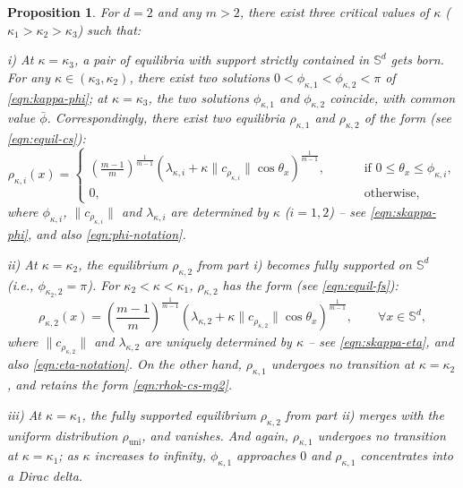 \documentclass[11pt]{amsart}
\newtheorem{proposition}{Proposition}[section]
\newcommand{\bbs}{\mathbb S}
\newcommand{\rhou}{\rho_{\mathrm{uni}}}
\newcommand{\dm}{d} %
\begin{document}
\begin{proposition} \cite[Proposition 6.1]{FePaVa2025}
\label{prop:bif-mg2}
For $\dm=2$ and any $m>2$, there exist three critical values of $\kappa$ ($\kappa_1>\kappa_2>\kappa_3$) such that:

\noindent i) At $\kappa=\kappa_3$, a pair of equilibria with support strictly contained in $\bbs^\dm$ gets born. For any $\kappa \in (\kappa_3,\kappa_2)$, there exist two solutions $0<\phi_{\kappa,1}<\phi_{\kappa,2}<\pi$ of \eqref{eqn:kappa-phi}; at $\kappa=\kappa_3$, the two solutions $\phi_{\kappa,1}$ and $\phi_{\kappa,2}$ coincide, with common value $\bar{\phi}$. Correspondingly, there exist two equilibria $\rho_{\kappa,1}$ and $\rho_{\kappa,2}$ of the form (see \eqref{eqn:equil-cs}):
\begin{equation}
\label{eqn:rhok-cs-mg2}
\rho_{\kappa,i}(x)=\begin{cases}
\left(\frac{m-1}{m}\right)^{\frac{1}{m-1}}\left(\lambda_{\kappa,i}+\kappa \|c_{\rho_{\kappa,i}}\| \cos\theta_x\right)^{\frac{1}{m-1}},\qquad&\text{ if }0\leq\theta_x\leq \phi_{\kappa,i},\\[5pt]
0,\qquad&\text{ otherwise},
\end{cases}
\end{equation}
where $\phi_{\kappa,i}$, $\|c_{\rho_{\kappa,i}}\|$ and $\lambda_{\kappa,i}$ are determined by $\kappa$ ($i=1,2$) -- see \eqref{eqn:skappa-phi}, and also \eqref{eqn:phi-notation}. 
\smallskip

\noindent ii) At $\kappa=\kappa_2$, the equilibrium $\rho_{\kappa,2}$ from part i) becomes fully supported on $\bbs^\dm$ (i.e., $\phi_{\kappa_2,2} = \pi$). For $\kappa_2<\kappa<\kappa_1$, $\rho_{\kappa,2}$ has the form (see  \eqref{eqn:equil-fs}):
\begin{equation}
\label{eqn:rhok-fs-mg2}
\rho_{\kappa,2}(x)=\left(\frac{m-1}{m}\right)^{\frac{1}{m-1}}\left(\lambda_{\kappa,2}+\kappa \|c_{\rho_{\kappa,2}} \|\cos\theta_x\right)^{\frac{1}{m-1}},\qquad\forall x\in \bbs^\dm,
\end{equation}
where $\|c_{\rho_{\kappa,2}}\|$ and $\lambda_{\kappa,2}$ are uniquely determined by $\kappa$ -- see \eqref{eqn:skappa-eta}, and also \eqref{eqn:eta-notation}.  On the other hand, $\rho_{\kappa,1}$ undergoes no transition at $\kappa=\kappa_2$, and retains the form \eqref{eqn:rhok-cs-mg2}.
\smallskip

\noindent iii) At $\kappa=\kappa_1$, the fully supported equilibrium $\rho_{\kappa,2}$ from part ii) merges with the uniform distribution $\rhou$, and vanishes. And again,  $\rho_{\kappa,1}$ undergoes no transition at $\kappa=\kappa_1$; as $\kappa$ increases to infinity, $\phi_{\kappa,1}$ approaches $0$ and $\rho_{\kappa,1}$ concentrates into a Dirac delta.
\end{proposition}
\end{document}
